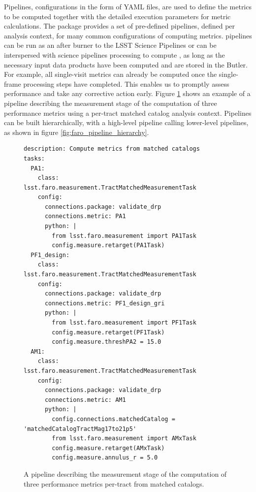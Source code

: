 Pipelines, configurations in the form of YAML files, are used to define the \faro metrics to be computed together with the  detailed execution parameters for metric calculations. 
The \faro package provides a set of pre-defined pipelines, defined per analysis context, for many common configurations of computing metrics. 
\faro pipelines can be run as an after burner to the LSST Science Pipelines or can be interspersed with science pipelines processing to compute , as long as the necessary input data products have been computed and are stored in the Butler.  
For example, all single-visit metrics can already be computed once the single-frame processing steps have completed. 
This enables us to promptly assess performance and take any corrective action early. 
Figure \ref{fig:faro_pipeline} shows an example of a \faro pipeline describing the measurement stage of the computation of three performance metrics  using a per-tract matched catalog analysis context.
Pipelines can be built hierarchically, with a high-level pipeline calling lower-level pipelines, as shown in figure \ref{fig:faro_pipeline_hierarchy}.

\begin{figure}[h]
  \lstset{language=YAML}
  \begin{lstlisting}
description: Compute metrics from matched catalogs
tasks:
  PA1:
    class: lsst.faro.measurement.TractMatchedMeasurementTask
    config:
      connections.package: validate_drp
      connections.metric: PA1
      python: |
        from lsst.faro.measurement import PA1Task
        config.measure.retarget(PA1Task)
  PF1_design:
    class: lsst.faro.measurement.TractMatchedMeasurementTask
    config:
      connections.package: validate_drp
      connections.metric: PF1_design_gri
      python: |
        from lsst.faro.measurement import PF1Task
        config.measure.retarget(PF1Task)
        config.measure.threshPA2 = 15.0
  AM1:
    class: lsst.faro.measurement.TractMatchedMeasurementTask
    config:
      connections.package: validate_drp
      connections.metric: AM1
      python: |
        config.connections.matchedCatalog = 'matchedCatalogTractMag17to21p5'
        from lsst.faro.measurement import AMxTask
        config.measure.retarget(AMxTask)
        config.measure.annulus_r = 5.0
    \end{lstlisting}
  \caption{A \faro pipeline describing the measurement stage of the computation of three performance metrics per-tract from matched catalogs.}
  \label{fig:faro_pipeline}
\end{figure}

